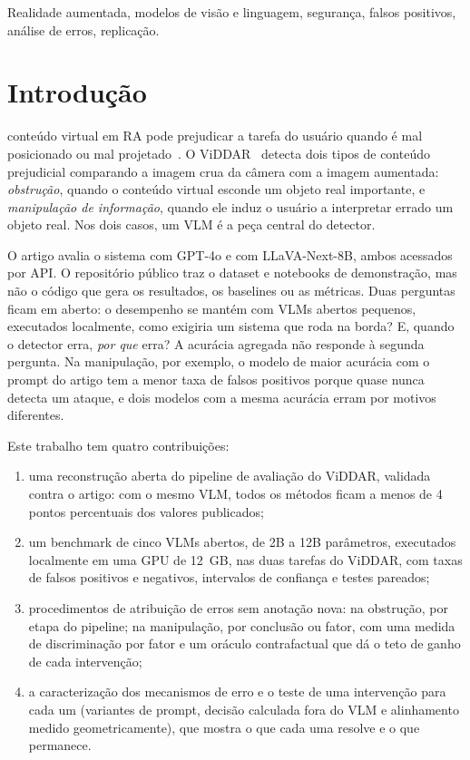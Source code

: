 \documentclass[journal,onecolumn]{IEEEtran}
\begin{document}
\begin{IEEEkeywords}
Realidade aumentada, modelos de visão e linguagem, segurança, falsos positivos, análise de erros,
replicação.
\end{IEEEkeywords}

\IEEEpeerreviewmaketitle

\section{Introdução}

 conteúdo virtual em RA pode prejudicar a tarefa do usuário quando é mal posicionado
ou mal projetado~\cite{sabelman2015,cheng2023}. O ViDDAR~\cite{viddar} detecta dois tipos de conteúdo
prejudicial comparando a imagem crua da câmera com a imagem aumentada: \emph{obstrução}, quando o
conteúdo virtual esconde um objeto real importante, e \emph{manipulação de informação}, quando ele
induz o usuário a interpretar errado um objeto real. Nos dois casos, um VLM é a peça central do
detector.

O artigo avalia o sistema com GPT-4o e com LLaVA-Next-8B, ambos acessados por API. O repositório
público traz o dataset e notebooks de demonstração, mas não o código que gera os resultados, os
baselines ou as métricas. Duas perguntas ficam em aberto: o desempenho se mantém com VLMs abertos
pequenos, executados localmente, como exigiria um sistema que roda na borda? E, quando o detector erra,
\emph{por que} erra? A acurácia agregada não responde à segunda pergunta. Na manipulação, por exemplo,
o modelo de maior acurácia com o prompt do artigo tem a menor taxa de falsos positivos porque quase
nunca detecta um ataque, e dois modelos com a mesma acurácia erram por motivos diferentes.

Este trabalho tem quatro contribuições:
\begin{enumerate}
\item uma reconstrução aberta do pipeline de avaliação do ViDDAR, validada contra o artigo: com o mesmo
  VLM, todos os métodos ficam a menos de 4 pontos percentuais dos valores publicados;
\item um benchmark de cinco VLMs abertos, de 2B a 12B parâmetros, executados localmente em uma GPU de
  12~GB, nas duas tarefas do ViDDAR, com taxas de falsos positivos e negativos, intervalos de confiança
  e testes pareados;
\item procedimentos de atribuição de erros sem anotação nova: na obstrução, por etapa do pipeline; na
  manipulação, por conclusão ou fator, com uma medida de discriminação por fator e um oráculo
  contrafactual que dá o teto de ganho de cada intervenção;
\item a caracterização dos mecanismos de erro e o teste de uma intervenção para cada um (variantes de
  prompt, decisão calculada fora do VLM e alinhamento medido geometricamente), que mostra o que cada
  uma resolve e o que permanece.
\end{enumerate}
\end{document}
